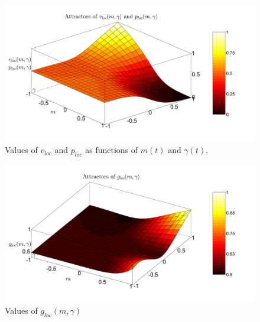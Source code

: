 \begin{figure}
\centering
\includegraphics[width=\linewidth]{figure/bifurcProsodyLoc.pdf}
\caption{Values of $v_{loc}$ and $p_{loc}$ as functions of $m(t)$ and $\gamma(t)$.}
\label{fig_pro_loc}
\end{figure}

\begin{figure}
\centering
\includegraphics[width=\linewidth]{figure/gazeLoc.pdf}
\caption{Values of $g_{loc}(m,\gamma)$}
\label{fig_gaze_loc}
\end{figure}



